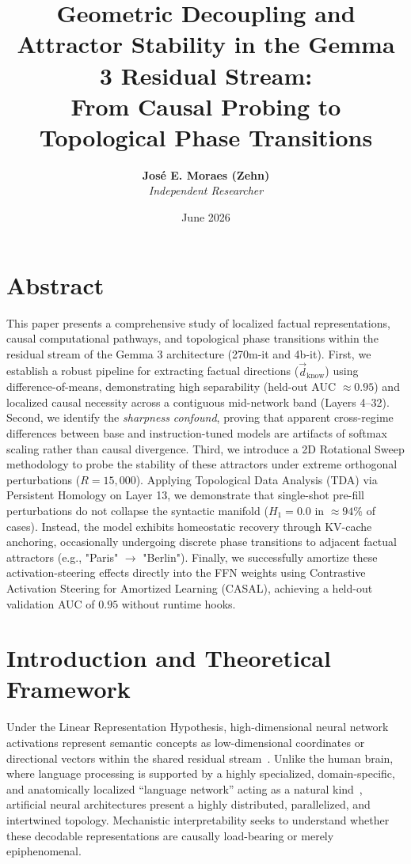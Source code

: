\documentclass[11pt,a4paper,oneside]{scrbook}
\title{\textbf{Geometric Decoupling and Attractor Stability in the Gemma 3 Residual Stream:\\ From Causal Probing to Topological Phase Transitions}}
\author{\textbf{José E. Moraes (Zehn)} \\ \textit{Independent Researcher} }
\date{June 2026}
\begin{document}
\maketitle

\chapter*{Abstract}
This paper presents a comprehensive study of localized factual representations, causal computational pathways, and topological phase transitions within the residual stream of the Gemma 3 architecture (270m-it and 4b-it). First, we establish a robust pipeline for extracting factual directions ($\vec{d}_{\text{know}}$) using difference-of-means, demonstrating high separability (held-out AUC $\approx 0.95$) and localized causal necessity across a contiguous mid-network band (Layers 4--32). Second, we identify the \textit{sharpness confound}, proving that apparent cross-regime differences between base and instruction-tuned models are artifacts of softmax scaling rather than causal divergence. Third, we introduce a 2D Rotational Sweep methodology to probe the stability of these attractors under extreme orthogonal perturbations ($R = 15,000$). Applying Topological Data Analysis (TDA) via Persistent Homology on Layer 13, we demonstrate that single-shot pre-fill perturbations do not collapse the syntactic manifold ($H_1 = 0.0$ in $\approx 94\%$ of cases). Instead, the model exhibits homeostatic recovery through KV-cache anchoring, occasionally undergoing discrete phase transitions to adjacent factual attractors (e.g., "Paris" $\to$ "Berlin"). Finally, we successfully amortize these activation-steering effects directly into the FFN weights using Contrastive Activation Steering for Amortized Learning (CASAL), achieving a held-out validation AUC of $0.95$ without runtime hooks.


\newpage

\chapter{Introduction and Theoretical Framework}
\label{sec:introduction}

Under the Linear Representation Hypothesis, high-dimensional neural network activations represent semantic concepts as low-dimensional coordinates or directional vectors within the shared residual stream~\cite{lieberum2024gemma, ferrando2025do}. Unlike the human brain, where language processing is supported by a highly specialized, domain-specific, and anatomically localized ``language network'' acting as a natural kind~\cite{fedorenko2024language}, artificial neural architectures present a highly distributed, parallelized, and intertwined topology. Mechanistic interpretability seeks to understand whether these decodable representations are causally load-bearing or merely epiphenomenal.
\end{document}
